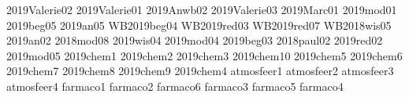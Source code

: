 2019Valerie02
2019Valerie01
2019Anwb02
2019Valerie03
2019Marc01
2019mod01
2019beg05
2019an05
WB2019beg04
WB2019red03
WB2019red07
WB2018wis05
2019an02
2018mod08
2019wis04
2019mod04
2019beg03
2018paul02
2019red02
2019mod05
2019chem1
2019chem2
2019chem3
2019chem10
2019chem5
2019chem6
2019chem7
2019chem8
2019chem9
2019chem4
atmosfeer1
atmosfeer2
atmosfeer3
atmosfeer4
farmaco1
farmaco2
farmaco6
farmaco3
farmaco5
farmaco4
